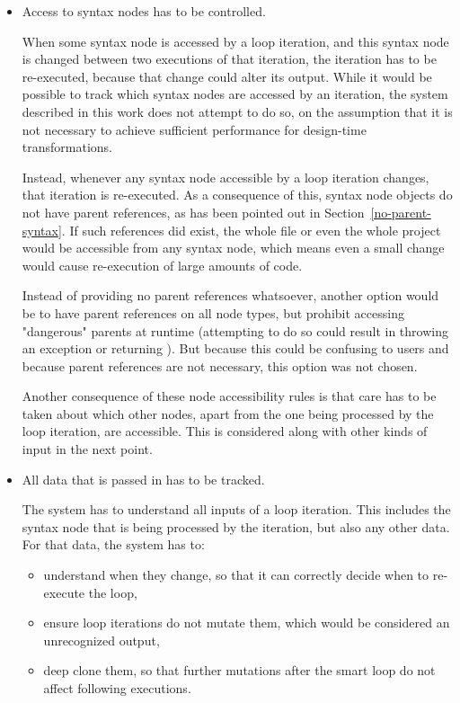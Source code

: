 \begin{itemize}
\item Access to syntax nodes has to be controlled.

\nopagebreak

When some syntax node is accessed by a loop iteration, and this syntax node is changed between two executions of that iteration, the iteration has to be re-executed, because that change could alter its output. While it would be possible to track which syntax nodes are accessed by an iteration, the system described in this work does not attempt to do so, on the assumption that it is not necessary to achieve sufficient performance for design-time transformations.

\label{no-parent-transform}
Instead, whenever any syntax node accessible by a loop iteration changes, that iteration is re-executed. As a consequence of this, syntax node objects do not have parent references, as has been pointed out in Section~\ref{no-parent-syntax}. If such references did exist, the whole file or even the whole project would be accessible from any syntax node, which means even a small change would cause re-execution of large amounts of code.

Instead of providing no parent references whatsoever, another option would be to have parent references on all node types, but prohibit accessing "dangerous" parents at runtime (attempting to do so could result in throwing an exception or returning ). But because this could be confusing to users and because parent references are not necessary, this option was not chosen.

Another consequence of these node accessibility rules is that care has to be taken about which other nodes, apart from the one being processed by the loop iteration, are accessible. This is considered along with other kinds of input in the next point.

\item All data that is passed in has to be tracked.

\nopagebreak

The system has to understand all inputs of a loop iteration. This includes the syntax node that is being processed by the iteration, but also any other data. For that data, the system has to:

\begin{itemize}
\item understand when they change, so that it can correctly decide when to re-execute the loop,
\item ensure loop iterations do not mutate them, which would be considered an unrecognized output,
\item deep clone them, so that further mutations after the smart loop do not affect following executions.
\end{itemize}


\end{itemize}
